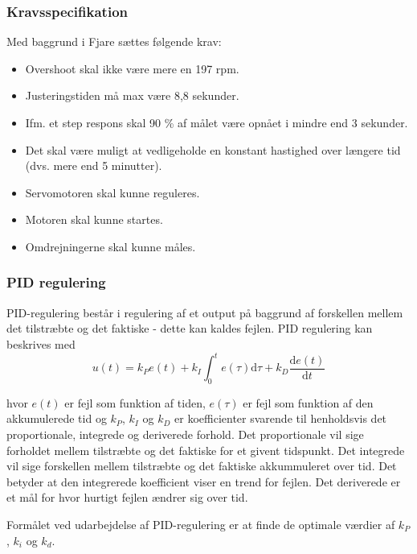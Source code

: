 \subsubsection{Kravsspecifikation}
\label{sec:kravsspecifikation}
Med baggrund i Fjare\autocite{pid1} sættes følgende krav:
\begin{itemize}
\item Overshoot skal ikke være mere en 197 rpm.
\item Justeringstiden må max være 8,8 sekunder.
\item Ifm. et step respons skal 90 \% af målet være opnået i mindre end 3 sekunder.
\item Det skal være muligt at vedligeholde en konstant hastighed over længere tid (dvs. mere end 5 minutter).
\item Servomotoren skal kunne reguleres.
\item Motoren skal kunne startes.
\item Omdrejningerne skal kunne måles.
\end{itemize}

\subsubsection{PID regulering}
\label{sec:overordnet-mal}

PID-regulering består i regulering af et output på baggrund af forskellen mellem det tilstræbte og det faktiske - dette kan kaldes fejlen. PID regulering kan beskrives med
\begin{equation}
  \label{eq:1}
  u(t)=k_Pe(t)+k_I \int_0^t e(\tau)\mathrm{d}\tau + k_D\frac{\mathrm{d}e(t)}{\mathrm{d}t}
\end{equation}

hvor $e(t)$ er fejl som funktion af tiden, $e(\tau)$ er fejl som funktion af den akkumulerede tid og $k_P$, $k_I$ og $k_D$ er koefficienter svarende til henholdsvis det proportionale, integrede og deriverede forhold. Det proportionale vil sige forholdet mellem tilstræbte og det faktiske for et givent tidspunkt. Det integrede vil sige forskellen mellem tilstræbte og det faktiske akkummuleret over tid. Det betyder at den integrerede koefficient viser en trend for fejlen. Det deriverede er et mål for hvor hurtigt fejlen ændrer sig over tid.

Formålet ved udarbejdelse af PID-regulering er at finde de optimale værdier af $k_P$, $k_i$ og $k_d$.


